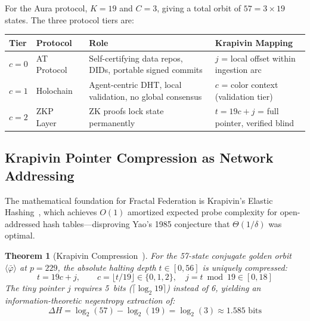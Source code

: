 \documentclass[12pt,a4paper]{article}
\newtheorem{theorem}{Theorem}[section]
\begin{document}
For the Aura protocol, $K = 19$ and $C = 3$, giving a total orbit of $57 = 3 \times 19$ states. The three protocol tiers are:

\begin{center}
\footnotesize
\begin{tabular}{@{}lp{2.8cm}p{4cm}p{3.5cm}@{}}
\toprule
\textbf{Tier} & \textbf{Protocol} & \textbf{Role} & \textbf{Krapivin Mapping} \\
\midrule
$c = 0$ & AT Protocol~\cite{atproto2024} & Self-certifying data repos, DIDs, portable signed commits & $j$ = local offset within ingestion arc \\
$c = 1$ & Holochain~\cite{brock2018holochain} & Agent-centric DHT, local validation, no global consensus & $c$ = color context (validation tier) \\
$c = 2$ & ZKP Layer~\cite{ben-sasson2018starks} & ZK proofs lock state permanently & $t = 19c + j$ = full pointer, verified blind \\
\bottomrule
\end{tabular}
\end{center}

\subsection{Krapivin Pointer Compression as Network Addressing}

The mathematical foundation for Fractal Federation is Krapivin's Elastic Hashing~\cite{krapivin2025optimal}, which achieves $O(1)$ amortized expected probe complexity for open-addressed hash tables---disproving Yao's 1985 conjecture that $\Theta(1/\delta)$ was optimal.

\begin{theorem}[Krapivin Compression~{\cite[Ch.~5, Thm.~5.7]{PP-I-Ch5}}]
\label{thm:krapivin}
For the 57-state conjugate golden orbit $\langle \bar{\varphi} \rangle$ at $p = 229$, the absolute halting depth $t \in [0, 56]$ is uniquely compressed:
\begin{equation}
t = 19c + j, \qquad c = \lfloor t / 19 \rfloor \in \{0, 1, 2\}, \quad j = t \bmod 19 \in [0, 18]
\end{equation}
The tiny pointer $j$ requires 5~bits ($\lceil \log_2 19 \rceil$) instead of 6, yielding an information-theoretic negentropy extraction of:
\begin{equation}
\Delta H = \log_2(57) - \log_2(19) = \log_2(3) \approx 1.585 \text{ bits}
\end{equation}
\end{theorem}
\end{document}
